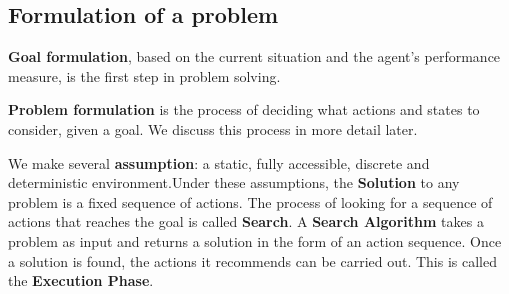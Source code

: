 \subsection{Formulation of a problem}
\textbf{Goal formulation}, based on the current situation and the agent’s performance measure, is the first step in problem solving.

\textbf{Problem formulation} is the process of deciding what actions and states to consider, given a goal. We discuss this process in more detail later.

We make several \textcolor{CadetBlue!90}{\textbf{assumption}}: a static, fully accessible, discrete and deterministic environment.Under these assumptions, the \textbf{Solution} to any problem is a fixed sequence of actions.
The process of looking for a sequence of actions that reaches the goal is called \textbf{Search}.
A \textbf{Search Algorithm} takes a problem as input and returns a solution in the form of an action sequence. Once a solution is found, the actions it recommends can be carried out. This is called the \textbf{Execution Phase}.

